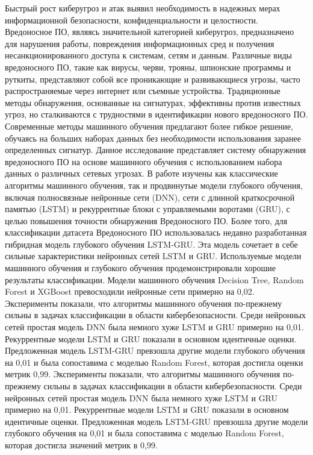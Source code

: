 Быстрый рост киберугроз и атак выявил необходимость в надежных мерах
информационной безопасности, конфиденциальности и целостности.
Вредоносное ПО, являясь значительной категорией киберугроз,
предназначено для нарушения работы, повреждения информационных сред и
получения несанкционированного доступа к системам, сетям и данным.
Различные виды вредоносного ПО, такие как вирусы, черви, трояны,
шпионские программы и руткиты, представляют собой все проникающие и
развивающиеся угрозы, часто распространяемые через интернет или съемные
устройства. Традиционные методы обнаружения, основанные на сигнатурах,
эффективны против известных угроз, но сталкиваются с трудностями в
идентификации нового вредоносного ПО. Современные методы машинного
обучения предлагают более гибкое решение, обучаясь на больших наборах
данных без необходимости использования заранее определенных сигнатур.
Данное исследование представляет систему обнаружения вредоносного ПО на
основе машинного обучения с использованием набора данных о различных
сетевых угрозах. В работе изучены как классические алгоритмы машинного
обучения, так и продвинутые модели глубокого обучения, включая
полносвязные нейронные сети (DNN), сети с длинной краткосрочной памятью
(LSTM) и рекуррентные блоки с управляемыми воротами (GRU), с целью
повышения точности обнаружения Вредоносного ПО. Более того, для
классификации датасета Вредоносного ПО использовалась недавно
разработанная гибридная модель глубокого обучения LSTM-GRU. Эта модель
сочетает в себе сильные характеристики нейронных сетей LSTM и GRU.
Используемые модели машинного обучения и глубокого обучения
продемонстрировали хорошие результаты классификации. Модели машинного
обучения Decision Tree, Random Forest и XGBoost превосходили нейронные
сети примерно на 0,02. Эксперименты показали, что алгоритмы машинного
обучения по-прежнему сильны в задачах классификации в области
кибербезопасности. Среди нейронных сетей простая модель DNN была немного
хуже LSTM и GRU примерно на 0,01. Рекуррентные модели LSTM и GRU
показали в основном идентичные оценки. Предложенная модель LSTM-GRU
превзошла другие модели глубокого обучения на 0,01 и была сопоставима с
моделью Random Forest, которая достигла оценки метрик 0,99. Эксперименты
показали, что алгоритмы машинного обучения по-прежнему сильны в задачах
классификации в области кибербезопасности. Среди нейронных сетей простая
модель DNN была немного хуже LSTM и GRU примерно на 0,01. Рекуррентные
модели LSTM и GRU показали в основном идентичные оценки. Предложенная
модель LSTM-GRU превзошла другие модели глубокого обучения на 0,01 и
была сопоставима с моделью Random Forest, которая достигла значений
метрик в 0,99.

